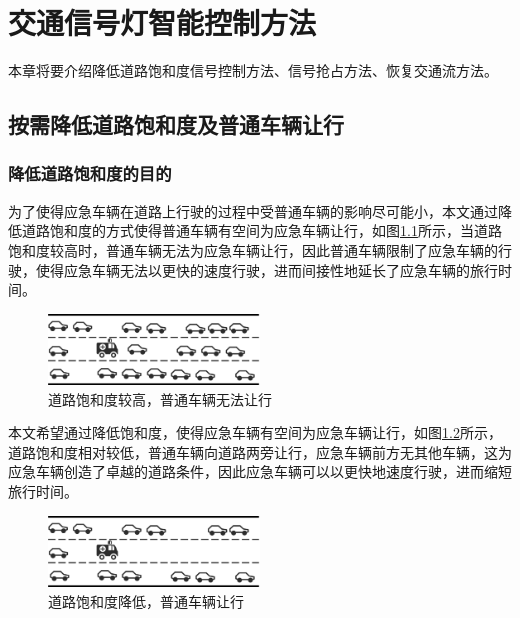 
\chapter{交通信号灯智能控制方法}
\label{ch4}
本章将要介绍降低道路饱和度信号控制方法、信号抢占方法、恢复交通流方法。




\section{按需降低道路饱和度及普通车辆让行}
\subsection{降低道路饱和度的目的}
为了使得应急车辆在道路上行驶的过程中受普通车辆的影响尽可能小，本文通过降低道路饱和度的方式使得普通车辆有空间为应急车辆让行，如图\ref{fig:highsituration}所示，当道路饱和度较高时，普通车辆无法为应急车辆让行，因此普通车辆限制了应急车辆的行驶，使得应急车辆无法以更快的速度行驶，进而间接性地延长了应急车辆的旅行时间。
\begin{figure}[ht]
	\centering
	\includegraphics[width=0.5\textwidth]{figures/highsituration.png}
	\caption{道路饱和度较高，普通车辆无法让行}
	\label{fig:highsituration}
\end{figure}

本文希望通过降低饱和度，使得应急车辆有空间为应急车辆让行，如图\ref{fig:lowsituration}所示，道路饱和度相对较低，普通车辆向道路两旁让行，应急车辆前方无其他车辆，这为应急车辆创造了卓越的道路条件，因此应急车辆可以以更快地速度行驶，进而缩短旅行时间。

\begin{figure}[ht]
	\centering
	\includegraphics[width=0.5\textwidth]{figures/lowsituration.png}
	\caption{道路饱和度降低，普通车辆让行}
	\label{fig:lowsituration}
\end{figure}


